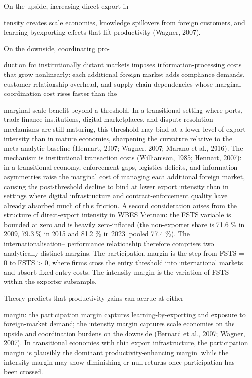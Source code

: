\documentclass[12pt,a4paper]{article}
\begin{document}
On the upside, increasing direct-export in-

tensity creates scale economies, knowledge spillovers from foreign
customers, and learning-byexporting effects that lift productivity
(Wagner, 2007).

On the downside, coordinating pro-

duction for institutionally distant markets imposes
information-processing costs that grow nonlinearly: each additional
foreign market adds compliance demands, customer-relationship overhead,
and supply-chain dependencies whose marginal coordination cost rises
faster than the

marginal scale benefit beyond a threshold. In a transitional setting
where ports, trade-finance institutions, digital marketplaces, and
dispute-resolution mechanisms are still maturing, this threshold may
bind at a lower level of export intensity than in mature economies,
sharpening the curvature relative to the meta-analytic baseline
(Hennart, 2007; Wagner, 2007; Marano et al., 2016). The mechanism is
institutional transaction costs (Williamson, 1985; Hennart, 2007): in a
transitional economy, enforcement gaps, logistics deficits, and
information asymmetries raise the marginal cost of managing each
additional foreign market, causing the post-threshold decline to bind at
lower export intensity than in settings where digital infrastructure and
contract-enforcement quality have already absorbed much of this
friction. A second consideration arises from the structure of
direct-export intensity in WBES Vietnam: the FSTS variable is bounded at
zero and is heavily zero-inflated (the non-exporter share is 71.6 \% in
2009, 79.3 \% in 2015 and 81.2 \% in 2023; pooled 77.4 \%). The
internationalisation-- performance relationship therefore comprises two
analytically distinct margins. The participation margin is the step from
FSTS = 0 to FSTS \textgreater{} 0, where firms cross the entry threshold
into international markets and absorb fixed entry costs. The intensity
margin is the variation of FSTS within the exporter subsample.

Theory predicts that productivity gains can accrue at either

margin: the participation margin captures learning-by-exporting and
exposure to foreign-market demand; the intensity margin captures scale
economies on the upside and coordination burdens on the downside
(Bernard et al., 2007; Wagner, 2007). In transitional economies with
thin export infrastructure, the participation margin is plausibly the
dominant productivity-enhancing margin, while the intensity margin may
show diminishing or null returns once participation has been crossed.
\end{document}
